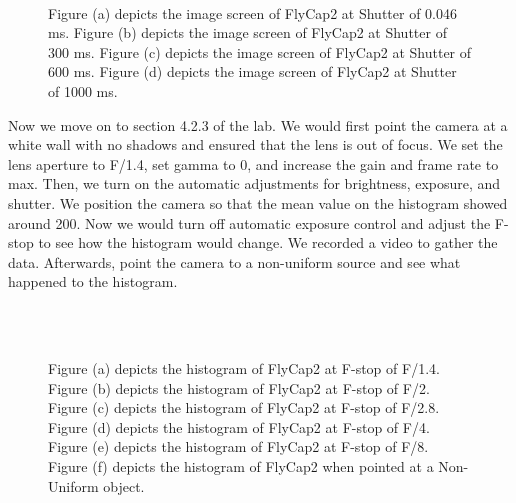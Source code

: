 \documentclass[10pt, preprint]{aastex}
\begin{document}
\begin{figure}[H]
  \centering
  \label{fig:screen1}
  \hfill
  \label{fig:screen2}
  \\
  \hfill
  \caption{\label{fig:six plot} Figure (a) depicts the image screen of FlyCap2 at Shutter of 0.046 ms. Figure (b) depicts the image screen of FlyCap2 at Shutter of 300 ms. Figure (c) depicts the image screen of FlyCap2 at Shutter of 600 ms. Figure (d) depicts the image screen of FlyCap2 at Shutter of 1000 ms.}
\end{figure}

Now we move on to section 4.2.3 of the lab. We would first point the camera at a white wall with no shadows and ensured that the lens is out of focus. We set the lens aperture to F/1.4, set gamma to 0, and increase the gain and frame rate to max. Then, we turn on the automatic adjustments for brightness, exposure, and shutter. We position the camera so that the mean value on the histogram showed around 200. Now we would turn off automatic exposure control and adjust the F-stop to see how the histogram would change. We recorded a video to gather the data.
Afterwards, point the camera to a non-uniform source and see what happened to the histogram.
\begin{figure}[H]
  \centering
  \label{fig:f1}
  \hfill
  \label{fig:f2}
  \\
  \label{fig:f3}
  \hfill
  \\
  \label{fig:f5}
  \hfill
  \caption{\label{fig:d plot} Figure (a) depicts the histogram of FlyCap2 at F-stop of F/1.4. Figure (b) depicts the histogram of FlyCap2 at F-stop of F/2. Figure (c) depicts the histogram of FlyCap2 at F-stop of F/2.8. Figure (d) depicts the histogram of FlyCap2 at F-stop of F/4. Figure (e) depicts the histogram of FlyCap2 at F-stop of F/8. Figure (f) depicts the histogram of FlyCap2 when pointed at a Non-Uniform object.}
\end{figure}
\end{document}
